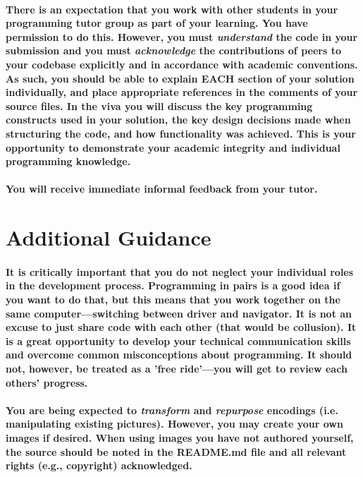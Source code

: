 \documentclass{../../fal_assignment}
\begin{document}
\paragraph{There is an expectation that you work with other students in your programming tutor group as part of your learning. You have permission to do this. However, you must \textit{understand} the code in your submission and you must \textit{acknowledge} the contributions of peers to your codebase explicitly and in accordance with academic conventions. As such, you should be able to explain \textbf{EACH} section of your solution individually, and place appropriate references in the comments of your source files. In the viva you will discuss the key programming constructs used in your solution, the key design decisions made when structuring the code, and how functionality was achieved. This is your opportunity to demonstrate your academic integrity and individual programming knowledge.}

\paragraph{You will receive immediate \textbf{informal feedback} from your \textbf{tutor}.}

\section*{Additional Guidance}

\paragraph{It is critically important that you do not neglect your individual roles in the development process. Programming in pairs is a good idea if you want to do that, but this means that you work together on the same computer---switching between driver and navigator. It is not an excuse to just share code with each other (that would be collusion). It is a great opportunity to develop your technical communication skills and overcome common misconceptions about programming. It should not, however, be treated as a 'free ride'---you will get to review each others' progress.}

\paragraph{You are being expected to \textit{transform} and \textit{repurpose} encodings (i.e. manipulating existing pictures). However, you may create your own images if desired. When using images you have not authored yourself, the source should be noted in the README.md file and all relevant rights (e.g., copyright) acknowledged. }
\end{document}
